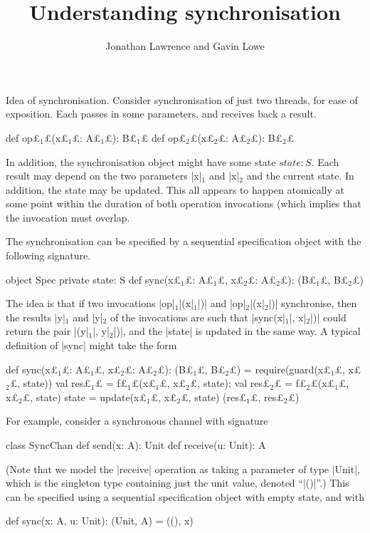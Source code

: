\documentclass[12pt,a4paper]{article}
\title{Understanding synchronisation}
\author{Jonathan Lawrence and Gavin Lowe}
\def\s#1{$_{#1}$}
\begin{document}
\maketitle

Idea of synchronisation.  Consider synchronisation of just two threads, for
ease of exposition.  Each passes in some parameters, and receives back a
result.  
\begin{scala}
  def op£\s1£(x£\s1£: A£\s1£): B£\s1£
  def op£\s2£(x£\s2£: A£\s2£): B£\s2£
\end{scala}
In addition, the synchronisation object might have some state $state: S$.
Each result may depend on the two parameters |x|$_1$ and |x|$_2$ and the
current state.  In addition, the state may be updated.  This all appears to
happen atomically at some point within the duration of both operation
invocations (which implies that the invocation must overlap.

The synchronisation can be specified by a sequential specification object with
the following signature.
%
\begin{scala}
object Spec{
  private state: S
  def sync(x£\s1£: A£\s1£, x£\s2£: A£\s2£): (B£\s1£, B£\s2£)
}
\end{scala}
%
The idea is that if two invocations |op|\s1|(x|\s1|)| and |op|\s2|(x|\s2|)|
synchronise, then the results |y|\s1 and |y|\s2 of the invocations are such
that |sync(x|\s1|, x|\s2|)| could return the pair |(y|\s1|, y|\s2|)|, and the
|state| is updated in the same way.  A typical definition of |sync| might take
the form
\begin{scala}
  def sync(x£\s1£: A£\s1£, x£\s2£: A£\s2£): (B£\s1£, B£\s2£) = {
    require(guard(x£\s1£, x£\s2£, state))
    val res£\s1£ = f£\s1£(x£\s1£, x£\s2£, state); val res£\s2£ = f£\s2£(x£\s1£, x£\s2£, state)
    state = update(x£\s1£, x£\s2£, state)
    (res£\s1£, res£\s2£)
  }
\end{scala}

For example, consider a synchronous channel with signature
\begin{scala}
class SyncChan{
  def send(x: A): Unit
  def receive(u: Unit): A
}
\end{scala}
%
(Note that we model the |receive| operation as taking a parameter of type
|Unit|, which is the singleton type containing just the unit value, denoted
``|()|''.) 
%
This can be specified using a sequential specification object with empty
state, and with 
\begin{scala}
  def sync(x: A, u: Unit): (Unit, A) = ((), x)
\end{scala}
\end{document}
